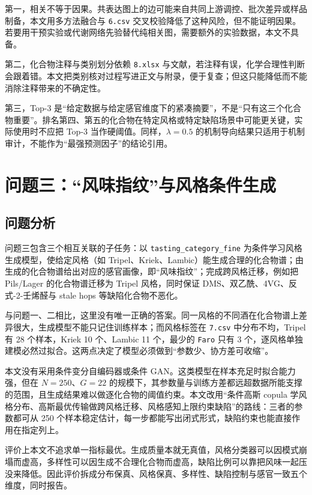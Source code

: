 ﻿\documentclass[UTF8,a4paper,zihao=-4]{ctexart}
\numberwithin{figure}{section}
\numberwithin{table}{section}
\numberwithin{equation}{section}
\newcommand{\file}[1]{\texttt{#1}}
\begin{document}
第一，相关不等于因果。共表达图上的边可能来自共同上游调控、批次差异或样品制备，本文用多方法融合与 \file{6.csv} 交叉校验降低了这种风险，但不能证明因果。若要用干预实验或代谢网络先验替代纯相关图，需要额外的实验数据，本文不具备。

第二，化合物注释与类别划分依赖 \file{8.xlsx} 与文献，若注释有误，化学合理性判断会跟着错。本文把类别核对过程写进正文与附录，便于复查；但这只能降低而不能消除注释带来的不确定性。

第三，Top-3 是“给定数据与给定感官维度下的紧凑摘要”，不是“只有这三个化合物重要”。排名第四、第五的化合物在特定风格或特定缺陷场景中可能更关键，实际使用时不应把 Top-3 当作硬阈值。同样，$\lambda=0.5$ 的机制导向结果只适用于机制审计，不能作为“最强预测因子”的结论引用。

\section{问题三：“风味指纹”与风格条件生成}
\label{sec:q3}

\subsection{问题分析}

问题三包含三个相互关联的子任务：以 \file{tasting\_category\_fine} 为条件学习风格生成模型，使给定风格（如 Tripel、Kriek、Lambic）能生成合理的化合物谱；由生成的化合物谱给出对应的感官画像，即“风味指纹”；完成跨风格迁移，例如把 Pils/Lager 的化合物谱迁移为 Tripel 风格，同时保证 DMS、双乙酰、4VG、反式-2-壬烯醛与 stale hops 等缺陷化合物不恶化。

与问题一、二相比，这里没有唯一正确的答案。同一风格的不同酒在化合物谱上差异很大，生成模型不能只记住训练样本；而风格标签在 \file{7.csv} 中分布不均，Tripel 有 28 个样本，Kriek 10 个、Lambic 11 个，最少的 \file{Faro} 只有 3 个，逐风格单独建模必然过拟合。这两点决定了模型必须做到“参数少、协方差可收缩”。

本文没有采用条件变分自编码器或条件 GAN。这类模型在样本充足时拟合能力强，但在 $N=250$、$G=22$ 的规模下，其参数量与训练方差都远超数据所能支撑的范围，且生成结果难以做逐化合物的阈值约束。本文改用“条件高斯 copula 学风格分布、高斯最优传输做跨风格迁移、风格感知上限约束缺陷”的路线：三者的参数都可从 250 个样本稳定估计，每一步都能写出闭式形式，缺陷约束也能直接作用在指定列上。

评价上本文不追求单一指标最优。生成质量本就无真值，风格分类器可以因模式崩塌而虚高，多样性可以因生成不合理化合物而虚高，缺陷比例可以靠把风味一起压没来降低。因此评价拆成分布保真、风格保真、多样性、缺陷控制与感官一致五个维度，同时报告。
\end{document}
